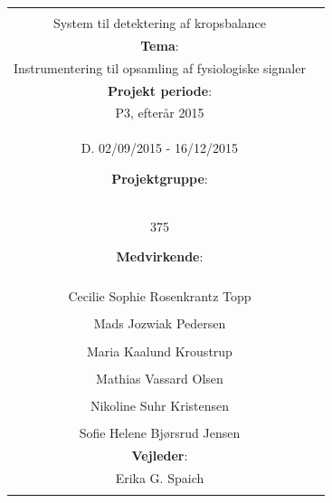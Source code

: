 \begin{nopagebreak}
{\begin{tabular}{cc}
{\begin{description}
\item \textbf{Titel}: \\
System til detektering af kropsbalance \\
\item \textbf{Tema}: \\ 
Instrumentering til opsamling af fysiologiske signaler\\
\item \textbf{Projekt periode}:\\
   P3, efterår 2015\\
   D. 02/09/2015 - 16/12/2015
  \hspace{4cm}
\item \textbf{Projektgruppe}:\\
  375
  \hspace{4cm}
\item \textbf{Medvirkende}:\\
\underline{\hspace{4cm}}\\
Cecilie Sophie Rosenkrantz Topp  \\
\underline{\hspace{4cm}}\\
Mads Jozwiak Pedersen \\
\underline{\hspace{4cm}}\\
Maria Kaalund Kroustrup \\
\underline{\hspace{4cm}}\\
Mathias Vassard Olsen \\
\underline{\hspace{4cm}}\\
Nikoline Suhr Kristensen \\
\underline{\hspace{4cm}}\\
Sofie Helene Bjørsrud Jensen \\
\hspace{2cm}
\item \textbf{Vejleder}:\\
Erika G. Spaich  \\

  
\end{description}

}
\end{tabular}}
\end{nopagebreak}
